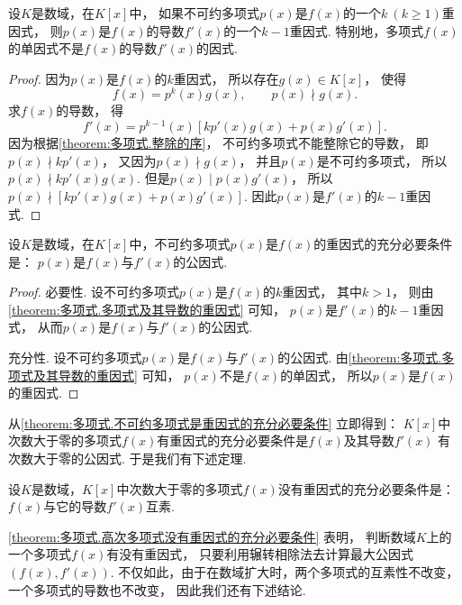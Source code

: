 \begin{theorem}\label{theorem:多项式.多项式及其导数的重因式}
设\(K\)是数域，在\(K[x]\)中，
如果不可约多项式\(p(x)\)是\(f(x)\)的一个\(k\ (k\geq1)\)重因式，
则\(p(x)\)是\(f(x)\)的导数\(f'(x)\)的一个\(k-1\)重因式.
特别地，多项式\(f(x)\)的单因式不是\(f(x)\)的导数\(f'(x)\)的因式.
\begin{proof}
因为\(p(x)\)是\(f(x)\)的\(k\)重因式，
所以存在\(g(x) \in K[x]\)，
使得\[
	f(x) = p^k(x) g(x), \qquad
	p(x) \nmid g(x).
\]
求\(f(x)\)的导数，
得\[
	f'(x) = p^{k-1}(x) [ k p'(x) g(x) + p(x) g'(x) ].
\]
因为根据\cref{theorem:多项式.整除的序}，
不可约多项式不能整除它的导数，
即\(p(x) \nmid k p'(x)\)，
又因为\(p(x) \nmid g(x)\)，
并且\(p(x)\)是不可约多项式，
所以\(p(x) \nmid k p'(x) g(x)\).
但是\(p(x) \mid p(x) g'(x)\)，
所以\(p(x) \nmid [k p'(x) g(x) + p(x) g'(x)]\).
因此\(p(x)\)是\(f'(x)\)的\(k-1\)重因式.
\end{proof}
\end{theorem}

\begin{corollary}\label{theorem:多项式.不可约多项式是重因式的充分必要条件}
设\(K\)是数域，在\(K[x]\)中，不可约多项式\(p(x)\)是\(f(x)\)的重因式的充分必要条件是：
\(p(x)\)是\(f(x)\)与\(f'(x)\)的公因式.
\begin{proof}
必要性.
设不可约多项式\(p(x)\)是\(f(x)\)的\(k\)重因式，
其中\(k>1\)，
则由\cref{theorem:多项式.多项式及其导数的重因式} 可知，
\(p(x)\)是\(f'(x)\)的\(k-1\)重因式，
从而\(p(x)\)是\(f(x)\)与\(f'(x)\)的公因式.

充分性.
设不可约多项式\(p(x)\)是\(f(x)\)与\(f'(x)\)的公因式.
由\cref{theorem:多项式.多项式及其导数的重因式} 可知，
\(p(x)\)不是\(f(x)\)的单因式，
所以\(p(x)\)是\(f(x)\)的重因式.
\end{proof}
\end{corollary}
从\cref{theorem:多项式.不可约多项式是重因式的充分必要条件} 立即得到：
\(K[x]\)中次数大于零的多项式\(f(x)\)有重因式的充分必要条件是\(f(x)\)及其导数\(f'(x)\)
有次数大于零的公因式.
于是我们有下述定理.
\begin{theorem}\label{theorem:多项式.高次多项式没有重因式的充分必要条件}
设\(K\)是数域，\(K[x]\)中次数大于零的多项式\(f(x)\)没有重因式的充分必要条件是：
\(f(x)\)与它的导数\(f'(x)\)互素.
\end{theorem}

\cref{theorem:多项式.高次多项式没有重因式的充分必要条件} 表明，
判断数域\(K\)上的一个多项式\(f(x)\)有没有重因式，
只要利用辗转相除法去计算最大公因式\((f(x),f'(x))\).
不仅如此，由于在数域扩大时，两个多项式的互素性不改变，一个多项式的导数也不改变，
因此我们还有下述结论.

